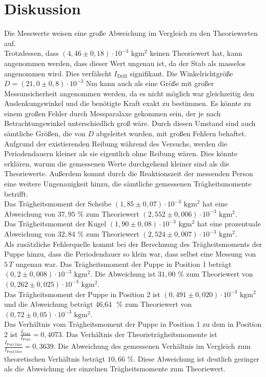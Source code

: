 \section{Diskussion}
\label{sec:Diskussion}
Die Messwerte weisen eine große Abweichung im Vergleich zu den Theoriewerten auf.  \\
Trotzdessen, dass $(4,46 \pm 0,18) \cdot 10^{-3} \,\,\unit{\kilo\gram\meter\squared}$ keinen Theoriewert hat, kann angenommen werden, dass 
dieser Wert ungenau ist, da der Stab 
als masselos angenommen wird. Dies verfälscht $I_{\text{Drill}}$ signifikant. Die Winkelrichtgröße 
$D = (21,0 \pm 0,8) \cdot 10^{-3} \,\,\unit{\newton\meter}$ kann auch als eine Größe mit großer Messunsicherheit angenommen
werden, da es nicht möglich war gleichzeitig den Auslenkungswinkel und die benötigte Kraft exakt zu bestimmen. Es könnte zu einem großen 
Fehler durch Messparalaxe gekommen sein, der je nach Betrachtungswinkel unterschiedlich groß wäre. Durch diesen Umstand sind auch sämtliche 
Größen, die von $D$ abgeleitet wurden, mit großen Fehlern behaftet. \\
Aufgrund der existierenden Reibung während des Versuchs, werden die 
Periodendauern kleiner als sie eigentlich ohne Reibung wären. Dies könnte erklären, warum die gemessenen Werte durchgehend kleiner sind als die 
Theoriewerte. Außerdem kommt durch die Reaktionszeit der messenden Person eine weitere Ungenauigkeit hinzu, die sämtliche gemessenen 
Trägheitsmomente betrifft.\\
Das Trägheitsmoment der Scheibe $(1,85 \pm 0,07) \cdot 10^{-3} \,\,\unit{\kilo\gram\meter\squared}$ hat eine Abweichung von $37,95 \,\,\%$ 
zum Theoriewert $(2,552 \pm 0,006) \cdot 10^{-3} \,\,\unit{\kilo\gram\meter\squared}$.\\
Das Trägheitsmoment der Kugel $(1,90 \pm 0,08) \cdot 10^{-3} \,\,\unit{\kilo\gram\meter\squared}$ hat eine prozentuale 
Abweichung von $32,84 \,\,\%$ zum Theoriewert $(2,524 \pm 0,007) \cdot 10^{-3} \,\,\unit{\kilo\gram\meter\squared}$. \\
Als zusätzliche Fehlerquelle kommt bei der Berechnung des Trägheitsmoments der Puppe hinzu, dass die Periodendauer so klein war, dass selbst eine
Messung von $5\,T$ ungenau war. Das Trägheitsmoment der Puppe in Position 1 beträgt $(0,2 \pm 0,008) \cdot 10^{-3}\,\, \unit{\kilo\gram\meter\squared}$.
 Die Abweichung ist $31,00 \,\,\%$ zum Theoriewert von $(0,262 \pm 0,025) \cdot 10^{-3}\,\, \unit{\kilo\gram\meter\squared}$.\\
Das Trägheitsmoment der Puppe in Position 2 ist $ (0,491 \pm 0,020) \cdot 10^{-3}\,\, \unit{\kilo\gram\meter\squared}$ und die Abweichung beträgt 46,64 \,\,\% zum Theoriewert 
von $(0,72 \pm 0,05) \cdot 10^{-3}\,\, \unit{\kilo\gram\meter\squared}$.\\
Das Verhältnis vom Trägheitsmoment der Puppe in Position 1 zu dem in Position 2 ist $\frac{I_{\text{Pos1}}}{I_{\text{Pos2}}} = 0,4073$. Das
Verhältnis der Theorieträgheitsmomente ist $\frac{I_{\text{Pos1,theo}}}{I_{\text{Pos2,theo}}} = 0,3639$. Die Abweichung des gemessenen Verhältnis im
Vergleich zum theoretischen Verhältnis beträgt $10,66 \,\,\%$. Diese Abweichung ist deutlich geringer als die Abweichung der einzelnen Trägheitsmomente 
zum Theoriewert. 
 
